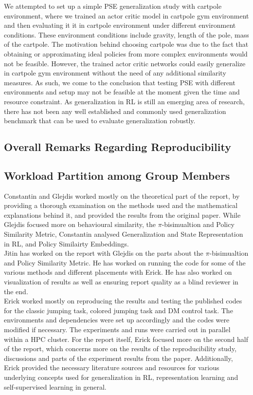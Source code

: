 \documentclass{usiinftr}
\begin{document}
We attempted to set up a simple PSE generalization study with cartpole environment, where we trained an actor critic model in cartpole gym environment and then evaluating it it in cartpole environment under different environment conditions. These environment conditions include gravity, length of the pole, mass of the cartpole. The motivation behind choosing cartpole was due to the fact that obtaining or approximating ideal policies from more complex environments would not be feasible. However, the trained actor critic networks could easily generalize in cartpole gym environment without the need of any additional similarity measures. As such, we come to the conclusion that testing PSE with different environments and setup may not be feasible at the moment given the time and resource constraint. As generalization in RL is still an emerging area of research, there has not been any well established and commonly used generalization benchmark that can be used to evaluate generalization robustly. 
\subsection{Overall Remarks Regarding Reproducibility}
\subsection{Workload Partition among Group Members}
Constantin and Glejdis worked mostly on the theoretical part of the report, by providing a thorough examination on the methods used and the mathematical explanations behind it, and provided the results from the original paper. While Glejdis focused more on behavioural similarity, the $\pi$-bisimualtion and Policy Similarity Metric, Constantin analysed Generalization and State Representation in RL, and Policy Similairty Embeddings. \\
Jitin has worked on the report with Glejdis on the parts about the $\pi$-bisimualtion and Policy Similarity Metric. He has worked on running the code for some of the various methods and different placements with Erick. He has also worked on visualization of results as well as ensuring report quality as a blind reviewer in the end.\\
Erick worked mostly on reproducing the results and testing the published codes for the classic jumping task, colored jumping task and DM control task. The environments and dependencies were set up accordingly and the codes were modified if necessary. The experiments and runs were carried out in parallel within a HPC cluster. For the report itself, Erick focused more on the second half of the report, which concerns more on the results of the reproducibility study, discussions and parts of the experiment results from the paper. Additionally, Erick provided the necessary literature sources and resources for  various underlying concepts used for generalization in RL, representation learning and self-supervised learning in general.


\end{document}

